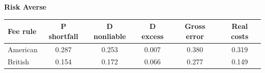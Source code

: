 \documentclass[10pt,border=5pt,varwidth=17cm]{standalone}
\begin{document}
\begingroup
\small
\setlength{\tabcolsep}{5pt}
\renewcommand{\arraystretch}{1.20}
\noindent\textbf{Risk Averse}\par\smallskip
\noindent\begin{tabularx}{\linewidth}{@{}>{\raggedright\arraybackslash}Xccccc@{}}
\toprule
\textbf{Fee rule} & \textbf{P shortfall} & \textbf{D nonliable} & \textbf{D excess} & \textbf{Gross error} & \textbf{Real costs} \\
\midrule
American & 0.287 & 0.253 & 0.007 & 0.380 & 0.319 \\
British & 0.154 & 0.172 & 0.066 & 0.277 & 0.149 \\
\bottomrule\end{tabularx}\par\medskip
\endgroup
\end{document}
